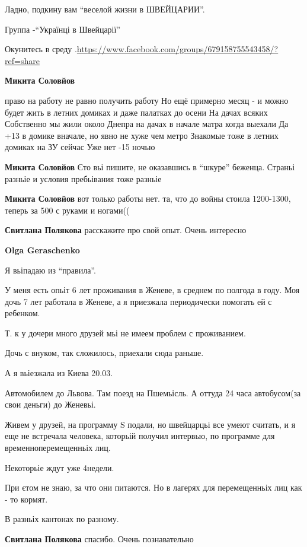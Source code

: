 \begin{itemize}
\begin{itemize}
Ладно, подкину вам \enquote{веселой жизни в ШВЕЙЦАРИИ}.

Группа -\enquote{Українці в Швейцарії}

Окунитесь в среду .\url{https://www.facebook.com/groups/679158755543458/?ref=share}

\textbf{Микита Соловйов} 

\obeycr
право на работу не равно получить работу
Но ещё примерно месяц - и можно будет жить в летних домиках и даже палатках до осени
На дачах всяких
Собственно мы жили около Днепра на дачах в начале матра когда выехали
Да +13 в домике вначале, но явно не хуже чем метро
Знакомые тоже в летних домиках на ЗУ сейчас
Уже нет -15 ночью
\restorecr

\textbf{Микита Соловйов} Єто вьі пишите, не оказавшись в \enquote{шкуре} беженца.
Страньі разньіе и условия пребьівания тоже разньіе

\textbf{Микита Соловйов} вот только работы нет. та, что до войны стоила 1200-1300, теперь за 500 с руками и ногами((

\textbf{Свитлана Полякова} расскажите про свой опыт. Очень интересно

\textbf{Olga Geraschenko} 

Я вьіпадаю из \enquote{правила}.

У меня есть опьіт 6 лет проживания в Женеве, в среднем по полгода в году. Моя
дочь 7 лет работала в Женеве, а я приезжала периодически помогать ей с
ребенком.

Т. к у дочери много друзей мьі не имеем проблем с проживанием.

Дочь с внуком, так сложилось, приехали сюда раньше.

А я вьіезжала из Киева 20.03.

Автомобилем до Львова. Там поезд на Пшемьісль. А оттуда 24 часа автобусом(за
свои деньги) до Женевьі.

Живем у друзей, на программу S подали, но швейцарцьі все умеют считать, и я еще
не встречала человека, которьій получил интервью, по программе для
временноперемещенньіх лиц.

Некоторьіе ждут уже 4недели.

При єтом не знаю, за что они питаются. Но в лагерях для перемещенньіх лиц как -
то кормят.

В разньіх кантонах по разному.

\textbf{Свитлана Полякова} спасибо. Очень познавательно


\end{itemize}
\end{itemize}
